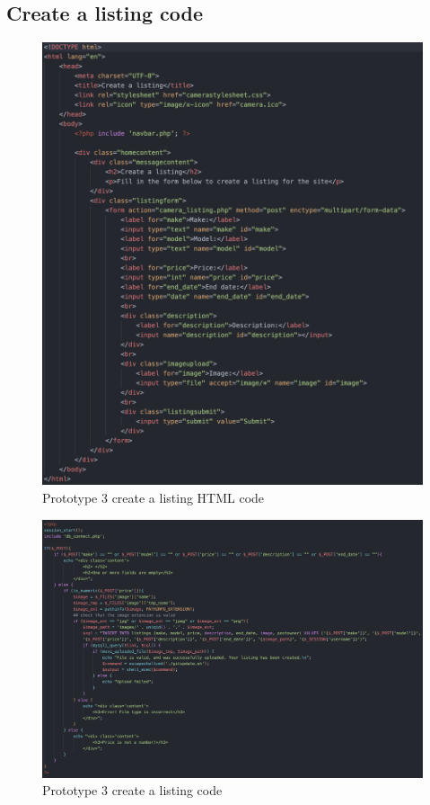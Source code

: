 \subsection{Create a listing code}
\begin{figure}[H]
    \centering
    \includegraphics[scale=0.5]{ch3_developing/proto3/createhtml.png}
    \caption{Prototype 3 create a listing HTML code}
    \label{fig:proto3_createhtml}
\end{figure} 
\begin{figure}[H]
    \centering
    \includegraphics[scale=0.45]{ch3_developing/proto3/create.png}
    \caption{Prototype 3 create a listing code}
    \label{fig:proto3_create}
\end{figure}
